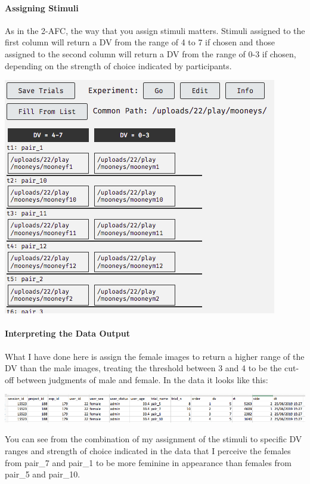\documentclass[]{book}
\let\oldparagraph\paragraph
\renewcommand{\paragraph}[1]{\oldparagraph{#1}\mbox{}}
\begin{document}
\paragraph{Assigning Stimuli}\label{assigning-stimuli}

As in the 2-AFC, the way that you assign stimuli matters. Stimuli
assigned to the first column will return a DV from the range of 4 to 7
if chosen and those assigned to the second column will return a DV from
the range of 0-3 if chosen, depending on the strength of choice
indicated by participants.

\includegraphics{images/screenshots/stim_jnd.png}

\paragraph{Interpreting the Data
Output}\label{interpreting-the-data-output}

What I have done here is assign the female images to return a higher
range of the DV than the male images, treating the threshold between 3
and 4 to be the cut-off between judgments of male and female. In the
data it looks like this:

\includegraphics{images/screenshots/data_jnd.png}

You can see from the combination of my assignment of the stimuli to
specific DV ranges and strength of choice indicated in the data that I
perceive the females from pair\_7 and pair\_1 to be more feminine in
appearance than females from pair\_5 and pair\_10.
\end{document}
